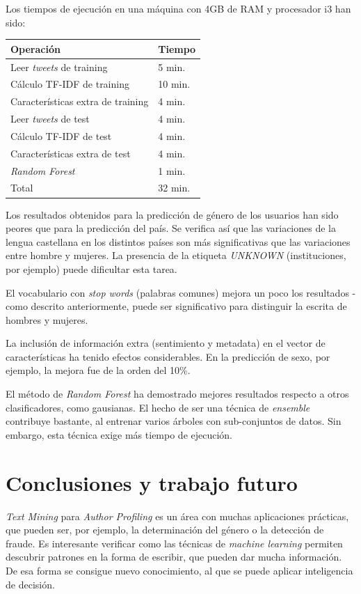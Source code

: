 \documentclass[11pt,a4paper]{article}
\begin{document}
  Los tiempos de ejecuci\'on en una m\'aquina con 4GB de RAM y procesador i3 han sido:
    \begin{center}
	\begin{tabular}{ l | l }
	  Operaci\'on & Tiempo\\ \hline
	  Leer {\em tweets} de training & 5 min. \\
	  C\'alculo TF-IDF de training & 10 min. \\
	  Caracter\'isticas extra de training & 4 min. \\
	  Leer {\em tweets} de test & 4 min. \\
	  C\'alculo TF-IDF de test & 4 min. \\
	  Caracter\'isticas extra de test & 4 min. \\
	  {\em Random Forest} & 1 min. \\ \hline
	  Total & 32 min.
	\end{tabular}
    \end{center}
  
  
  Los resultados obtenidos para la predicci\'on de g\'enero de los usuarios han sido peores que para la predicci\'on del pa\'is. Se verifica as\'i que las variaciones de la lengua castellana en los distintos pa\'ises son m\'as significativas que las variaciones entre hombre y mujeres. La presencia de la etiqueta {\em UNKNOWN} (instituciones, por ejemplo) puede dificultar esta tarea. 

  El vocabulario con {\em stop words} (palabras comunes) mejora un poco los resultados - como descrito anteriormente, puede ser significativo para distinguir la escrita de hombres y mujeres. 

  La inclusi\'on de informaci\'on extra (sentimiento y metadata) en el vector de caracter\'isticas ha tenido efectos considerables. En la predicci\'on de sexo, por ejemplo, la mejora fue de la orden del 10\%. 

  El m\'etodo de {\em Random Forest} ha demostrado mejores resultados respecto a otros clasificadores, como gausianas. El hecho de ser una t\'ecnica de {\em ensemble} contribuye bastante, al entrenar varios \'arboles con sub-conjuntos de datos. Sin embargo, esta t\'ecnica exige m\'as tiempo de ejecuci\'on.


\section{Conclusiones y trabajo futuro}
  
  {\em Text Mining} para {\em Author Profiling} es un \'area con muchas aplicaciones pr\'acticas, que pueden ser, por ejemplo, la determinaci\'on del g\'enero o la detecci\'on de fraude. Es interesante verificar como las t\'ecnicas de {\em machine learning} permiten descubrir patrones en la forma de escribir, que pueden dar mucha informaci\'on. De esa forma se consigue nuevo conocimiento, al que se puede aplicar inteligencia de decisi\'on.
\end{document}
